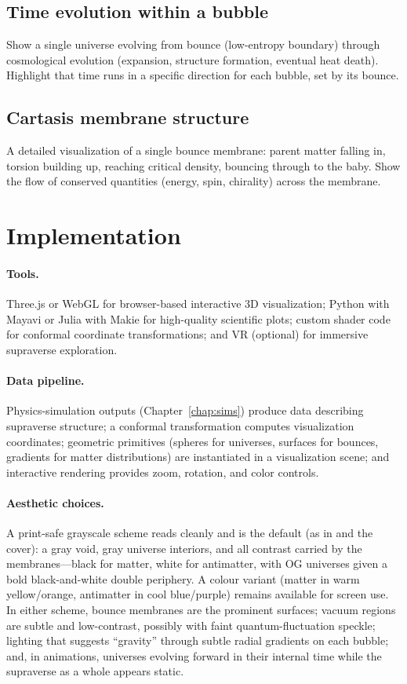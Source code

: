 \subsection{Time evolution within a bubble}

Show a single universe evolving from bounce (low-entropy boundary) through
cosmological evolution (expansion, structure formation, eventual heat death).
Highlight that time runs in a specific direction for each bubble, set by its
bounce.

\subsection{Cartasis membrane structure}

A detailed visualization of a single bounce membrane: parent matter falling in,
torsion building up, reaching critical density, bouncing through to the baby.
Show the flow of conserved quantities (energy, spin, chirality) across the
membrane.

\section{Implementation}

\paragraph{Tools.} Three.js or WebGL for browser-based interactive 3D
visualization; Python with Mayavi or Julia with Makie for high-quality scientific
plots; custom shader code for conformal coordinate transformations; and VR
(optional) for immersive supraverse exploration.

\paragraph{Data pipeline.} Physics-simulation outputs
(Chapter~\ref{chap:sims}) produce data describing supraverse structure; a
conformal transformation computes visualization coordinates; geometric primitives
(spheres for universes, surfaces for bounces, gradients for matter distributions)
are instantiated in a visualization scene; and interactive rendering provides
zoom, rotation, and color controls.

\paragraph{Aesthetic choices.} A print-safe grayscale scheme reads cleanly and is
the default (as in  and the cover): a gray void, gray universe
interiors, and all contrast carried by the membranes---black for matter, white for
antimatter, with OG universes given a bold black-and-white double periphery. A colour
variant (matter in warm yellow/orange, antimatter in cool blue/purple) remains
available for screen use. In either scheme, bounce membranes are the prominent surfaces;
vacuum regions are subtle and low-contrast, possibly with faint
quantum-fluctuation speckle;
lighting that suggests ``gravity'' through subtle radial gradients on each
bubble; and, in animations, universes evolving forward in their internal time
while the supraverse as a whole appears static.


